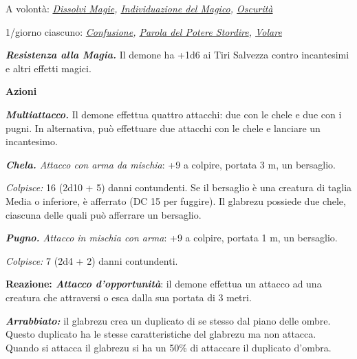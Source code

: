 \begin{multicols}{2}
{A volontà: \emph{\hyperlink{Dissolvi Magie}{Dissolvi Magie}, \hyperlink{Individuazione del Magico}{Individuazione del Magico}, \hyperlink{Oscurità}{Oscurità}}

1/giorno ciascuno: \emph{\hyperlink{Confusione}{Confusione}, \hyperlink{Parola del Potere Stordire}{Parola del Potere Stordire}, \hyperlink{Volare}{Volare}}

\emph{\textbf{Resistenza alla Magia.}} Il demone ha +1d6 ai Tiri Salvezza contro incantesimi e altri effetti magici.

\textbf{Azioni}

\emph{\textbf{Multiattacco.}} Il demone effettua quattro attacchi: due con le chele e due con i pugni. In alternativa, può effettuare due attacchi con le chele e lanciare un incantesimo.

\emph{\textbf{Chela.} Attacco con arma da mischia}: +9 a colpire, portata 3 m, un bersaglio.

\emph{Colpisce:} 16 (2d10 + 5) danni contundenti. Se il bersaglio è una creatura di taglia Media o inferiore, è afferrato (DC 15 per fuggire). Il glabrezu possiede due chele, ciascuna delle quali può afferrare un bersaglio.

\emph{\textbf{Pugno.} Attacco in mischia con arma}: +9 a colpire, portata 1 m, un bersaglio.

\emph{Colpisce:} 7 (2d4 + 2) danni contundenti.

\textbf{Reazione: \emph{Attacco d'opportunità}}: il demone effettua un attacco ad una creatura che attraversi o esca dalla sua portata di 3 metri.

\emph{\textbf{Arrabbiato:}} il glabrezu crea un duplicato di se stesso dal piano delle ombre. Questo duplicato ha le stesse caratteristiche del glabrezu ma non attacca. Quando si attacca il glabrezu si ha un 50\% di attaccare il duplicato d'ombra.

}
\end{multicols}
